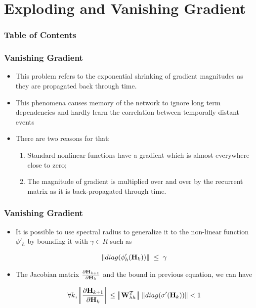 \documentclass[
	11pt,
]{beamer}
\begin{document}
\section{Exploding and Vanishing Gradient}
\begin{frame}
	\frametitle{Table of Contents}
	\tableofcontents[currentsection]
\end{frame}

\begin{frame}
	\frametitle{Vanishing Gradient}
	\begin{itemize}
		\item This problem refers to the exponential shrinking of gradient
		magnitudes as they are propagated back through time.
		\bigskip
		\item This phenomena causes memory of the network to ignore long
		term dependencies and hardly learn the correlation between
		temporally distant events
		\bigskip
		\item There are two reasons for that:
		\begin{enumerate}
			\item Standard nonlinear functions have a gradient which is almost everywhere close to zero;
			\item The magnitude of gradient is multiplied over and over by the recurrent matrix as it is back-propagated through time.
		\end{enumerate}
	\end{itemize}
\end{frame}

\begin{frame}
	\frametitle{Vanishing Gradient}
	\begin{itemize}
		\item It is possible to use spectral radius to generalize it to the non-linear function $\phi'_h$ by bounding it with $\gamma \in R$
		such as
		\bigskip
	\begin{block}{}
		\begin{equation*}
			\norm{diag(\phi'_h(\mathbf{H}_k))} \; \le \; \gamma
		\end{equation*}
	\end{block}
		\bigskip
		\item The Jacobian matrix $\pdv{\mathbf{H}_{k+1}}{\mathbf{H}_k}$ and the bound
		in previous equation, we can have
	\begin{block}{}
		\bigskip
		\begin{equation*}
			\forall k, \norm{\pdv{\mathbf{H}_{k+1}}{\mathbf{H}_k}}  \le \norm{\mathbf{W}_{hh}^T} \;
			 \norm{diag(\sigma'(\mathbf{H}_k))} <  1
		\end{equation*}
	\end{block}
\end{itemize}
\end{frame}
\end{document}

